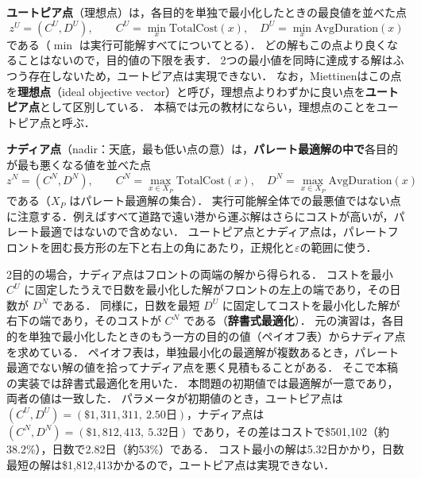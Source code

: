 \documentclass[a4paper,11pt]{ltjsarticle}
\newcommand{\cost}{\mathrm{TotalCost}}
\newcommand{\dur}{\mathrm{AvgDuration}}
\begin{document}
\textbf{ユートピア点}（理想点）は，各目的を単独で最小化したときの最良値を並べた点
\begin{equation}
z^U=(C^U, D^U),\qquad C^U=\min_{x} \cost(x),\quad D^U=\min_{x} \dur(x)
\end{equation}
である（$\min$ は実行可能解すべてについてとる）．
どの解もこの点より良くなることはないので，目的値の下限を表す．
2つの最小値を同時に達成する解はふつう存在しないため，ユートピア点は実現できない．
なお，Miettinen\cite{miettinen1999}はこの点を\textbf{理想点}（ideal objective vector）と呼び，理想点よりわずかに良い点を\textbf{ユートピア点}として区別している．
本稿では元の教材にならい，理想点のことをユートピア点と呼ぶ．

\textbf{ナディア点}（nadir：天底，最も低い点の意）は，\textbf{パレート最適解の中で}各目的が最も悪くなる値を並べた点
\begin{equation}
z^N=(C^N, D^N),\qquad C^N=\max_{x\in X_P} \cost(x),\quad D^N=\max_{x\in X_P} \dur(x)
\end{equation}
である（$X_P$ はパレート最適解の集合）．
実行可能解全体での最悪値ではない点に注意する．例えばすべて道路で遠い港から運ぶ解はさらにコストが高いが，パレート最適ではないので含めない．
ユートピア点とナディア点は，パレートフロントを囲む長方形の左下と右上の角にあたり，正規化と$\varepsilon$の範囲に使う．

2目的の場合，ナディア点はフロントの両端の解から得られる．
コストを最小 $C^U$ に固定したうえで日数を最小化した解がフロントの左上の端であり，その日数が $D^N$ である．
同様に，日数を最短 $D^U$ に固定してコストを最小化した解が右下の端であり，そのコストが $C^N$ である（\textbf{辞書式最適化}）．
元の演習は，各目的を単独で最小化したときのもう一方の目的の値（ペイオフ表）からナディア点を求めている．
ペイオフ表は，単独最小化の最適解が複数あるとき，パレート最適でない解の値を拾ってナディア点を悪く見積もることがある\cite{miettinen1999}．
そこで本稿の実装では辞書式最適化を用いた．
本問題の初期値では最適解が一意であり，両者の値は一致した．
パラメータが初期値のとき，ユートピア点は $(C^U, D^U)=(\$1{,}311{,}311,\ 2.50\text{日})$，ナディア点は $(C^N, D^N)=(\$1{,}812{,}413,\ 5.32\text{日})$ であり，その差はコストで\$501,102（約38.2\%），日数で2.82日（約53\%）である．
コスト最小の解は5.32日かかり，日数最短の解は\$1,812,413かかるので，ユートピア点は実現できない．
\end{document}
